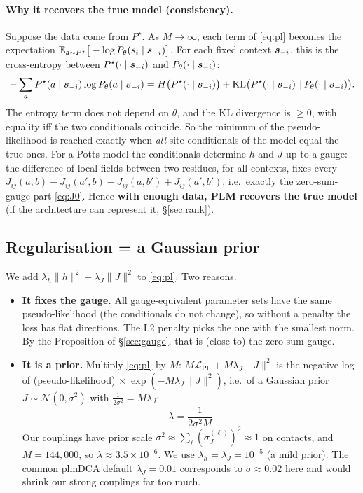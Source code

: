 \paragraph{Why it recovers the true model (consistency).} Suppose the data come from $P^\star$. As
$M\to\infty$, each term of \eqref{eq:pl} becomes the expectation
$\mathbb{E}_{\bm{s}\sim P^\star}\big[-\log P_\theta(s_i\mid\bm{s}_{-i})\big]$. For each fixed context $\bm{s}_{-i}$, this is the
cross-entropy between $P^\star(\cdot\mid\bm{s}_{-i})$ and $P_\theta(\cdot\mid\bm{s}_{-i})$:
\[
-\sum_aP^\star(a\mid\bm{s}_{-i})\log P_\theta(a\mid\bm{s}_{-i}) = H\big(P^\star(\cdot\mid\bm{s}_{-i})\big)+\mathrm{KL}\big(P^\star(\cdot\mid\bm{s}_{-i})\,\|\,P_\theta(\cdot\mid\bm{s}_{-i})\big).
\]
The entropy term does not depend on $\theta$, and the KL divergence is $\ge0$, with equality iff the two
conditionals coincide. So the minimum of the pseudo-likelihood is reached exactly when \emph{all} site
conditionals of the model equal the true ones. For a Potts model the conditionals determine
$h$ and $J$ up to a gauge: the difference of local fields between two residues, for all contexts, fixes every
$J_{ij}(a,b)-J_{ij}(a',b)-J_{ij}(a,b')+J_{ij}(a',b')$, i.e.\ exactly the zero-sum-gauge part \eqref{eq:J0}.
Hence \textbf{with enough data, PLM recovers the true model} (if the architecture can represent it,
\S\ref{sec:rank}).

\subsection{Regularisation = a Gaussian prior}
We add $\lambda_h\|h\|^2+\lambda_J\|J\|^2$ to \eqref{eq:pl}. Two reasons.
\begin{itemize}[nosep]
\item \textbf{It fixes the gauge.} All gauge-equivalent parameter sets have the same pseudo-likelihood
(the conditionals do not change), so without a penalty the loss has flat directions. The L2 penalty picks
the one with the smallest norm. By the Proposition of \S\ref{sec:gauge}, that is (close to) the zero-sum gauge.
\item \textbf{It is a prior.} Multiply \eqref{eq:pl} by $M$: $M\mathcal L_{\text{PL}}+M\lambda_J\|J\|^2$ is
the negative log of (pseudo-likelihood) $\times\ \exp(-M\lambda_J\|J\|^2)$, i.e.\ of a Gaussian prior
$J\sim\mathcal N(0,\sigma^2)$ with $\frac1{2\sigma^2}=M\lambda_J$:
\[
\boxed{\;\lambda=\frac1{2\sigma^2M}\;}
\]
Our couplings have prior scale $\sigma^2\approx\sum_\ell(\sigma^{(\ell)}_J)^2\approx1$ on contacts, and
$M=144{,}000$, so $\lambda\approx3.5\times10^{-6}$. We use $\lambda_h=\lambda_J=10^{-5}$ (a mild prior). The
common plmDCA default $\lambda_J=0.01$ corresponds to $\sigma\approx0.02$ here and would shrink our strong
couplings far too much.
\end{itemize}

